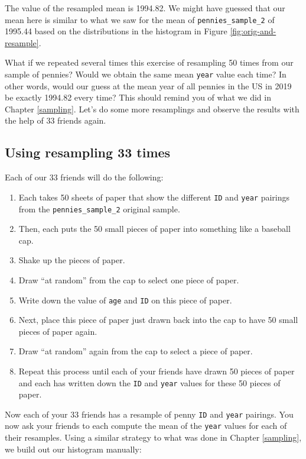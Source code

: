 \documentclass[12pt, krantz2,]{krantz}
\providecommand{\tightlist}{%
  \setlength{\itemsep}{0pt}\setlength{\parskip}{0pt}}
\begin{document}
The value of the resampled mean is 1994.82. We might have guessed that our mean here is similar to what we saw for the mean of \texttt{pennies\_sample\_2} of 1995.44 based on the distributions in the histogram in Figure \ref{fig:orig-and-resample}.

What if we repeated several times this exercise of resampling 50 times from our sample of pennies? Would we obtain the same mean \texttt{year} value each time? In other words, would our guess at the mean year of all pennies in the US in 2019 be exactly 1994.82 every time? This should remind you of what we did in Chapter \ref{sampling}. Let's do some more resamplings and observe the results with the help of 33 friends again.

\hypertarget{student-resamples}{%
\subsection{Using resampling 33 times}\label{student-resamples}}

Each of our 33 friends will do the following:

\begin{enumerate}
\def\labelenumi{\arabic{enumi}.}
\tightlist
\item
  Each takes 50 sheets of paper that show the different \texttt{ID} and \texttt{year} pairings from the \texttt{pennies\_sample\_2} original sample.
\item
  Then, each puts the 50 small pieces of paper into something like a baseball cap.
\item
  Shake up the pieces of paper.
\item
  Draw ``at random'' from the cap to select one piece of paper.
\item
  Write down the value of \texttt{age} and \texttt{ID} on this piece of paper.
\item
  Next, place this piece of paper just drawn back into the cap to have 50 small pieces of paper again.
\item
  Draw ``at random'' again from the cap to select a piece of paper.
\item
  Repeat this process until each of your friends have drawn 50 pieces of paper and each has written down the \texttt{ID} and \texttt{year} values for these 50 pieces of paper.
\end{enumerate}

Now each of your 33 friends has a resample of penny \texttt{ID} and \texttt{year} pairings. You now ask your friends to each compute the mean of the \texttt{year} values for each of their resamples. Using a similar strategy to what was done in Chapter \ref{sampling}, we build out our histogram manually:
\end{document}
